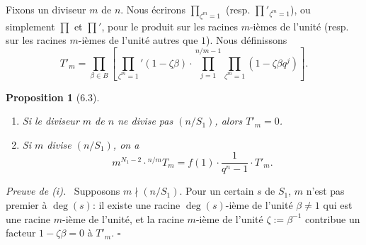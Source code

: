 \documentclass[10pt]{article}
\newcommand{\degm}{\operatorname{deg}}
\theoremstyle{deligne}
\newtheorem*{proposition*}{Proposition}
\newenvironment{proofdel}[1][Preuve.]{\textit{#1}\ }{\hfill$\square$}
\begin{document}
Fixons un diviseur $m$ de $n$. Nous écrirons $\prod_{\zeta^m=1}$ (resp. $\prod'_{\zeta^m=1}$), ou simplement $\prod$ et $\prod'$, pour le produit sur les racines $m$-ièmes de l'unité (resp. sur les racines $m$-ièmes de l'unité autres que $1$). Nous définissons
\begin{equation}\tag{6.2.3}
T'_m=\prod_{\beta\in B}\left[\prod_{\zeta^m=1}'(1-\zeta\beta)\cdot
\prod_{j=1}^{n/m-1}\prod_{\zeta^m=1}(1-\zeta\beta q^j)\right].
\end{equation}

\begin{proposition*}[6.3]
\begin{enumerate}[label=(\roman*)]
\item Si le diviseur $m$ de $n$ ne divise pas $(n/S_1)$, alors $T'_m=0$.
\item Si $m$ divise $(n/S_1)$, on a
\begin{equation}\tag{6.3.1}
m^{N_1-2}\cdot{}^{n/m}T_m=f(1)\cdot\frac{1}{q^n-1}\cdot T'_m.
\end{equation}
\end{enumerate}
\end{proposition*}

\begin{proofdel}[Preuve de (i).]
Supposons $m\nmid(n/S_1)$. Pour un certain $s$ de $S_1$, $m$ n'est pas premier à $\degm(s)$: il existe une racine $\degm(s)$-ième de l'unité $\beta\ne1$ qui est une racine $m$-ième de l'unité, et la racine $m$-ième de l'unité $\zeta:=\beta^{-1}$ contribue un facteur $1-\zeta\beta=0$ à $T'_m$.
\end{proofdel}
\end{document}
